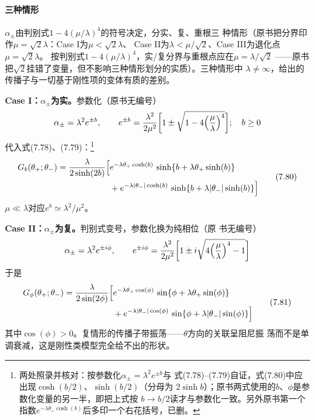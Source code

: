\paragraph{三种情形}
$\alpha_{\pm}$由判别式$1-4(\mu/\lambda)^{4}$的符号决定，分实、复、重根三
种情形（原书把分界印作$\mu=\sqrt{2}\lambda$：Case I为$\mu<\sqrt{2}\lambda$、
Case II为$\lambda<\mu/\sqrt{2}$、Case III为退化点$\mu=\sqrt{2}\lambda$。
按判别式$1-4(\mu/\lambda)^{4}$，实/复分界与重根点应在$\mu=\lambda/\sqrt{2}$
——原书把$\sqrt{2}$挂错了变量，但不影响三种情形划分的实质）。三种情形中
$\lambda\neq\infty$，给出的传播子与一切基于刚性项的变体有质的差别。

\textbf{Case I：$\alpha_{\pm}$为实。}参数化（原书无编号）
\begin{equation*}
\alpha_{\pm}=\lambda^{2}e^{\pm b},\qquad
e^{\pm b}=\frac{\lambda^{2}}{2\mu^{2}}\biggl[1\pm\sqrt{
1-4\Bigl(\frac{\mu}{\lambda}\Bigr)^{4}}\biggr];\quad b\ge0
\end{equation*}
代入式(7.78)、(7.79)：\footnote{两处照录并核对：按参数化$\alpha_{\pm}=\lambda^{2}e^{\pm b}$与
式(7.78)--(7.79)自证，式(7.80)中应出现$\cosh(b/2)$、$\sinh(b/2)$（分母为
$2\sinh b$）；原书两式使用的$b$、$\phi$是参数化变量的另一半，即把上式按
$b\to b/2$读才与参数化一致。另外原书第一个指数$e^{-\lambda\theta_{+}
\cosh(b)}$后多印一个右花括号，已删。}
\begin{equation*}
\begin{aligned}
G_{b}(\theta_{+};\theta_{-})=\frac{\lambda}{2\sinh(2b)}\Bigl[
&e^{-\lambda\theta_{+}\cosh(b)}\,\sinh\{b+\lambda\theta_{+}\sinh(b)\}\\
&+e^{-\lambda|\theta_{-}|\cosh(b)}\,\sinh\{b+\lambda|\theta_{-}|\sinh(b)\}
\Bigr]
\end{aligned}
\tag{7.80}
\end{equation*}$\mu\ll\lambda$对应$e^{b}\simeq
\lambda^{2}/\mu^{2}$。

\textbf{Case II：$\alpha_{\pm}$为复。}判别式变号，参数化换为纯相位（原
书无编号）
\begin{equation*}
\alpha_{\pm}=\lambda^{2}e^{\pm i\phi},\qquad
e^{\pm i\phi}=\frac{\lambda^{2}}{2\mu^{2}}\biggl[1\pm i\sqrt{
4\Bigl(\frac{\mu}{\lambda}\Bigr)^{4}-1}\biggr]
\end{equation*}
于是
\begin{equation*}
\begin{aligned}
G_{\phi}(\theta_{+};\theta_{-})=\frac{\lambda}{2\sin(2\phi)}\Bigl[
&e^{-\lambda\theta_{+}\cos(\phi)}\,\sin\{\phi+\lambda\theta_{+}\sin(\phi)\}\\
&+e^{-\lambda|\theta_{-}|\cos(\phi)}\,\sin\{\phi+\lambda|\theta_{-}|\sin(\phi)\}
\Bigr]
\end{aligned}
\tag{7.81}
\end{equation*}
其中$\cos(\phi)>0$。复情形的传播子带振荡——$\theta$方向的关联呈阻尼振
荡而不是单调衰减，这是刚性类模型完全给不出的形状。

